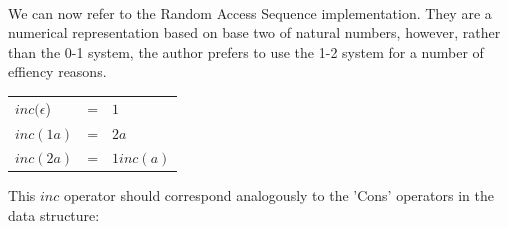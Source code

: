 \documentclass[12pt,twoside,notitlepage]{report}
\begin{document}
\begin{code}
\\
\>[2]\<[4]%
\>[4]  \AgdaSymbol{(} \AgdaSymbol{:} \AgdaSymbol{)} \AgdaSymbol{:}  \<%
\\
\>[4]\<[6]%
\>[6] \AgdaSymbol{:}    \<%
\\
%
\\
\>[0]\<[4]%
\>[4]  \AgdaSymbol{(} \AgdaSymbol{:}   \AgdaSymbol{)(} \AgdaSymbol{:} \AgdaSymbol{)} \AgdaSymbol{:}  \<%
\\
\>[4]\<[6]%
\>[6] \AgdaSymbol{:} \AgdaSymbol{(} \AgdaSymbol{)}  \AgdaSymbol{(} \AgdaSymbol{)}    \<%
\\
\end{code}


We can now refer to the Random Access Sequence implementation.
They are a numerical representation based on base two of natural numbers, however, rather than the 0-1 system, the author prefers to use the 1-2 system for a number of effiency reasons.

\begin{center}
	\begin{tabular}{lcl}
	$inc(\epsilon$) & = & $1$ \\
	$inc(1a)$ & = & $2a$ \\ 
	$inc(2a)$ & = & $1inc(a)$ \\
	\end{tabular} 
\end{center}

This $inc$ operator should correspond analogously to the 'Cons' operators in the data structure:
\end{document}

